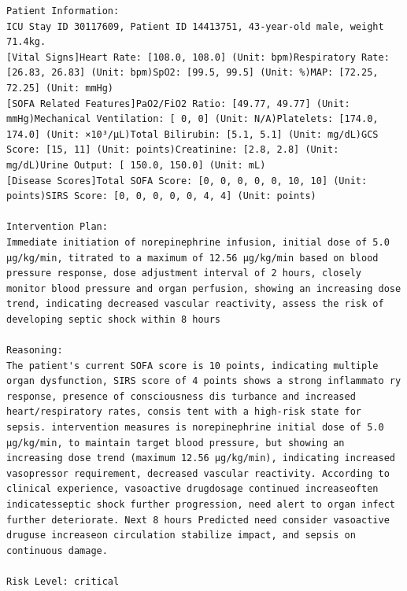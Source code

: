 \documentclass{article}
\begin{document}
\begin{lstlisting}[caption={Result for Patient 30117609}, label={lst:30117609}]
Patient Information:
ICU Stay ID 30117609, Patient ID 14413751, 43-year-old male, weight 71.4kg. 
[Vital Signs]Heart Rate: [108.0, 108.0] (Unit: bpm)Respiratory Rate: [26.83, 26.83] (Unit: bpm)SpO2: [99.5, 99.5] (Unit: %)MAP: [72.25, 72.25] (Unit: mmHg)
[SOFA Related Features]PaO2/FiO2 Ratio: [49.77, 49.77] (Unit: mmHg)Mechanical Ventilation: [ 0, 0] (Unit: N/A)Platelets: [174.0, 174.0] (Unit: ×10³/μL)Total Bilirubin: [5.1, 5.1] (Unit: mg/dL)GCS Score: [15, 11] (Unit: points)Creatinine: [2.8, 2.8] (Unit: mg/dL)Urine Output: [ 150.0, 150.0] (Unit: mL) 
[Disease Scores]Total SOFA Score: [0, 0, 0, 0, 0, 10, 10] (Unit: points)SIRS Score: [0, 0, 0, 0, 0, 4, 4] (Unit: points)

Intervention Plan:
Immediate initiation of norepinephrine infusion, initial dose of 5.0 μg/kg/min, titrated to a maximum of 12.56 μg/kg/min based on blood pressure response, dose adjustment interval of 2 hours, closely monitor blood pressure and organ perfusion, showing an increasing dose trend, indicating decreased vascular reactivity, assess the risk of developing septic shock within 8 hours

Reasoning:
The patient's current SOFA score is 10 points, indicating multiple organ dysfunction, SIRS score of 4 points shows a strong inflammato ry response, presence of consciousness dis turbance and increased heart/respiratory rates, consis tent with a high-risk state for sepsis. intervention measures is norepinephrine initial dose of 5.0 μg/kg/min, to maintain target blood pressure, but showing an increasing dose trend (maximum 12.56 μg/kg/min), indicating increased vasopressor requirement, decreased vascular reactivity. According to clinical experience, vasoactive drugdosage continued increaseoften indicatesseptic shock further progression, need alert to organ infect further deteriorate. Next 8 hours Predicted need consider vasoactive druguse increaseon circulation stabilize impact, and sepsis on continuous damage.

Risk Level: critical
\end{lstlisting}
\end{document}
